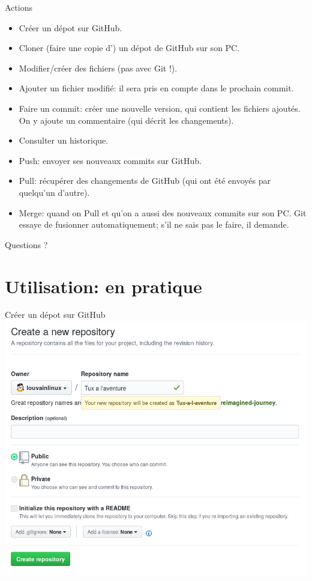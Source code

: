 \documentclass{beamer}
\begin{document}
\begin{frame}{Actions}
    \begin{itemize}
        \item Créer un dépot sur GitHub.
        \item Cloner (faire une copie d') un dépot de GitHub sur son PC.
        \item Modifier/créer des fichiers (pas avec Git !).
        \item Ajouter un fichier modifié: il sera pris en compte dans le
            prochain commit.
        \item Faire un commit: créer une nouvelle version, qui contient les
            fichiers ajoutés. On y ajoute un commentaire (qui décrit les
            changements).
        \item Consulter un historique.
        \item Push: envoyer ses nouveaux commits sur GitHub.
        \item Pull: récupérer des changements de GitHub (qui ont été envoyés
            par quelqu'un d'autre).
        \item Merge: quand on Pull et qu'on a aussi des nouveaux commits sur
            son PC. Git essaye de fusionner automatiquement; s'il ne sais pas
            le faire, il demande.
    \end{itemize}
\end{frame}

\begin{frame}[standout]
    Questions ?
\end{frame}


\section{Utilisation: en pratique}

\begin{frame}{Créer un dépot sur GitHub}
    \includegraphics[scale=0.35]{img/github_desktop/new_repo.png}
\end{frame}
\end{document}
